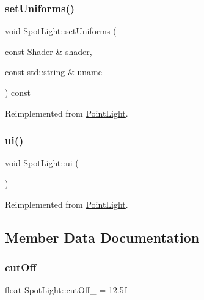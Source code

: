 \subsubsection{\texorpdfstring{set\+Uniforms()}{setUniforms()}}
{\footnotesize\ttfamily void Spot\+Light\+::set\+Uniforms (\begin{DoxyParamCaption}\item[{const \hyperlink{classShader}{Shader} \&}]{shader,  }\item[{const std\+::string \&}]{uname }\end{DoxyParamCaption}) const\hspace{0.3cm}{\ttfamily [virtual]}}



Reimplemented from \hyperlink{classPointLight_abf6f298a0d04b636e22a3a5903e5b823}{Point\+Light}.

\mbox{\label{classSpotLight_a7ca46a2356ceb4f193704632e1f17bb4}} 
\subsubsection{\texorpdfstring{ui()}{ui()}}
{\footnotesize\ttfamily void Spot\+Light\+::ui (\begin{DoxyParamCaption}{ }\end{DoxyParamCaption})\hspace{0.3cm}{\ttfamily [virtual]}}



Reimplemented from \hyperlink{classPointLight_a538a42e0d1d713c57e46e492d352b34e}{Point\+Light}.



\subsection{Member Data Documentation}
\mbox{\label{classSpotLight_a434b4b2ad7072d34e238c529b6376608}} 
\subsubsection{\texorpdfstring{cut\+Off\+\_\+}{cutOff\_}}
{\footnotesize\ttfamily float Spot\+Light\+::cut\+Off\+\_\+ = 12.\+5f}


